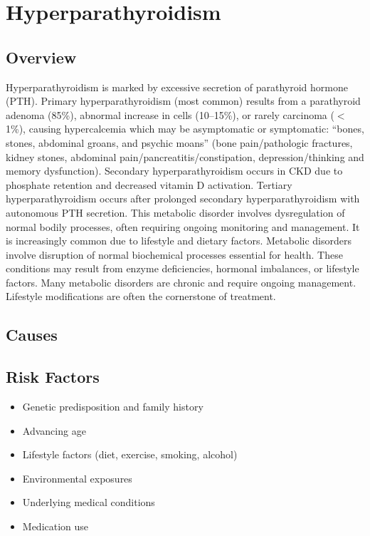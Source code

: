 \chapter{Hyperparathyroidism}
\label{sec:Hyperparathyroidism}

\section{Overview}
Hyperparathyroidism is marked by excessive secretion of parathyroid hormone (PTH). Primary hyperparathyroidism (most common) results from a parathyroid adenoma (85\%), abnormal increase in cells (10--15\%), or rarely carcinoma ($<$1\%), causing hypercalcemia which may be asymptomatic or symptomatic: ``bones, stones, abdominal groans, and psychic moans'' (bone pain/pathologic fractures, kidney stones, abdominal pain/pancreatitis/constipation, depression/thinking and memory dysfunction). Secondary hyperparathyroidism occurs in CKD due to phosphate retention and decreased vitamin D activation. Tertiary hyperparathyroidism occurs after prolonged secondary hyperparathyroidism with autonomous PTH secretion. This metabolic disorder involves dysregulation of normal bodily processes, often requiring ongoing monitoring and management. It is increasingly common due to lifestyle and dietary factors. Metabolic disorders involve disruption of normal biochemical processes essential for health. These conditions may result from enzyme deficiencies, hormonal imbalances, or lifestyle factors. Many metabolic disorders are chronic and require ongoing management. Lifestyle modifications are often the cornerstone of treatment.
\section{Causes}
\section{Risk Factors}
\begin{itemize}[noitemsep]
  \item Genetic predisposition and family history
  \item Advancing age
  \item Lifestyle factors (diet, exercise, smoking, alcohol)
  \item Environmental exposures
  \item Underlying medical conditions
  \item Medication use
\end{itemize}
